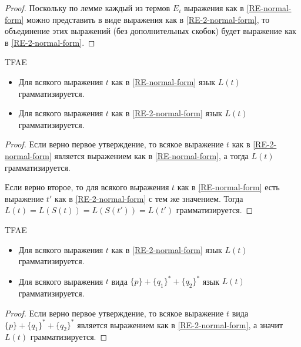 \documentclass[12pt,a4paper]{article}
\begin{document}
\begin{problem}{8}
\begin{enumerate}
                \begin{proof}
                    Поскольку по лемме каждый из термов $E_i$ выражения как в \ref{RE-normal-form} можно представить в виде выражения как в \ref{RE-2-normal-form}, то объединение этих выражений (без дополнительных скобок) будет выражение как в \ref{RE-2-normal-form}.
                \end{proof}

                \begin{corollary}
                    TFAE
                    \begin{itemize}
                        \item Для всякого выражения $t$ как в \ref{RE-normal-form} язык $L(t)$ грамматизируется.
                        \item Для всякого выражения $t$ как в \ref{RE-2-normal-form} язык $L(t)$ грамматизируется.
                    \end{itemize}
                \end{corollary}

                \begin{proof}
                    Если верно первое утверждение, то всякое выражение $t$ как в \ref{RE-2-normal-form} является выражением как в \ref{RE-normal-form}, а тогда $L(t)$ грамматизируется.

                    Если верно второе, то для всякого выражения $t$ как в \ref{RE-normal-form} есть выражение $t'$ как в \ref{RE-2-normal-form} с тем же значением. Тогда $L(t) = L(S(t)) = L(S(t')) = L(t')$ грамматизируется.
                \end{proof}

                \begin{lemma}
                    TFAE
                    \begin{itemize}
                        \item Для всякого выражения $t$ как в \ref{RE-2-normal-form} язык $L(t)$ грамматизируется.
                        \item Для всякого выражения $t$ вида $\{p\} + \{q_1\}^* + \{q_2\}^*$ язык $L(t)$ грамматизируется.
                    \end{itemize}
                \end{lemma}

                \begin{proof}
                    Если верно первое утверждение, то всякое выражение $t$ вида $\{p\} + \{q_1\}^* + \{q_2\}^*$ является выражением как в \ref{RE-2-normal-form}, а значит $L(t)$ грамматизируется.


\end{proof}
\end{enumerate}
\end{problem}
\end{document}
